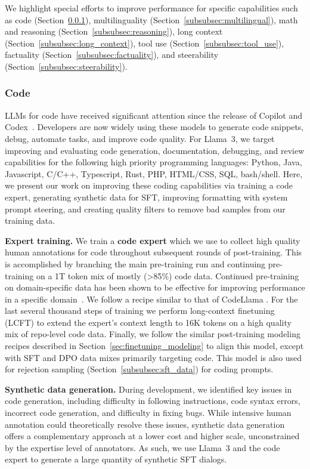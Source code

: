 We highlight special efforts to improve performance for specific capabilities such as code (Section~\ref{subsubsec:code}), multilinguality (Section~\ref{subsubsec:multilingual}), math and reasoning (Section~\ref{subsubsec:reasoning}), long context (Section~\ref{subsubsec:long_context}), tool use (Section~\ref{subsubsec:tool_use}), factuality (Section~\ref{subsubsec:factuality}), and steerability (Section~\ref{subsubsec:steerability}).  

\subsubsection{Code}
\label{subsubsec:code}

LLMs for code have received significant attention since the release of Copilot and Codex~\citep{chen2021evaluating}. Developers are now widely using these models to generate code snippets, debug, automate tasks, and improve code quality. For Llama~3, we target improving and evaluating code generation, documentation, debugging, and review capabilities for the following high priority programming languages: Python, Java, Javascript, C/C++, Typescript, Rust, PHP, HTML/CSS, SQL, bash/shell. Here, we present our work on improving these coding capabilities via training a code expert, generating synthetic data for SFT, improving formatting with system prompt steering, and creating quality filters to remove bad samples from our training data.

\textbf{Expert training.} We train a \textbf{code expert} which we use to collect high quality human annotations for code throughout subsequent rounds of post-training. This is accomplished by branching the main pre-training run and continuing pre-training on a 1T token mix of mostly (>85\%) code data. Continued pre-training on domain-specific data has been shown to be effective for improving performance in a specific domain~\citep{gururangan2024dontstoppretraining}. We follow a recipe similar to that of CodeLlama \citep{codellama}. For the last several thousand steps of training we perform {long-context finetuning} (LCFT) to extend the expert's context length to 16K tokens on a high quality mix of repo-level code data. Finally, we follow the similar post-training modeling recipes described in Section~\ref{sec:finetuning_modeling} to align this model, except with SFT and DPO data mixes primarily targeting code.  This model is also used for rejection sampling (Section~\ref{subsubsec:sft_data}) for coding prompts.

\textbf{Synthetic data generation.} During development, we identified key issues in code generation, including difficulty in following instructions, code syntax errors, incorrect code generation, and difficulty in fixing bugs. While intensive human annotation could theoretically resolve these issues, synthetic data generation offers a complementary approach at a lower cost and higher scale, unconstrained by the expertise level of annotators. As such, we use Llama~3 and the code expert to generate a large quantity of synthetic SFT dialogs. 

